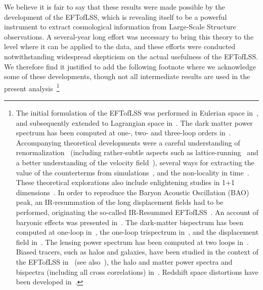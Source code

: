 \documentclass[12pt,a4paper]{article}
\renewcommand{\(}{\left(}
\renewcommand{\)}{\right)}
\begin{document}
We believe it is fair to say that these results were made possible by the development of the EFTofLSS, which is revealing itself to be a powerful instrument to extract cosmological information from Large-Scale Structure observations. 
A several-year long effort was necessary to bring this theory to the level where it can be applied to the data, and these efforts were conducted notwithstanding widespread skepticism on the actual usefulness of the EFTofLSS.  We therefore find it justified to add the following footnote where we acknowledge some of these developments, though not all intermediate results are used in the present analysis~\footnote{The initial formulation of the EFTofLSS was performed in Eulerian space in~\cite{Baumann:2010tm,Carrasco:2012cv}, and subsequently extended to Lagrangian space in~\cite{Porto:2013qua}. 
The dark matter power spectrum has been computed at one-, two- and three-loop orders in~\cite{Carrasco:2012cv, Carrasco:2013sva, Carrasco:2013mua, Carroll:2013oxa, Senatore:2014via, Baldauf:2015zga, Foreman:2015lca, Baldauf:2015aha, Cataneo:2016suz, Lewandowski:2017kes,Konstandin:2019bay}.
Accompanying theoretical developments were a careful understanding of renormalization~\cite{Carrasco:2012cv,Pajer:2013jj,Abolhasani:2015mra} (including rather-subtle aspects such as lattice-running~\cite{Carrasco:2012cv} and a better understanding of the velocity field~\cite{Carrasco:2013sva,Mercolli:2013bsa}), several ways for extracting the value of the counterterms from simulations~\cite{Carrasco:2012cv,McQuinn:2015tva}, and the non-locality in time~\cite{Carrasco:2013sva, Carroll:2013oxa,Senatore:2014eva}.
These theoretical explorations also include enlightening studies in 1+1 dimensions~\cite{McQuinn:2015tva,Pajer:2017ulp}.
In order to reproduce the Baryon Acoustic Oscillation (BAO) peak, an IR-resummation of the long displacement fields had to be performed, originating the so-called IR-Resummed EFTofLSS~\cite{Senatore:2014vja,Baldauf:2015xfa,Senatore:2017pbn,Lewandowski:2018ywf,Blas:2016sfa}.
An account of baryonic effects was presented in~\cite{Lewandowski:2014rca,Braganca:2020nhv}. The dark-matter bispectrum has been computed at one-loop in~\cite{Angulo:2014tfa, Baldauf:2014qfa}, the one-loop trispectrum in~\cite{Bertolini:2016bmt}, and the displacement field in~\cite{Baldauf:2015tla}.
The lensing power spectrum has been computed at two loops in~\cite{Foreman:2015uva}.
Biased tracers, such as halos and galaxies, have been studied in the context of the EFTofLSS in~\cite{ Senatore:2014eva, Mirbabayi:2014zca, Angulo:2015eqa, Fujita:2016dne, Perko:2016puo, Nadler:2017qto} (see also~\cite{McDonald:2009dh}), the halo and matter power spectra and bispectra (including all cross correlations) in~\cite{Senatore:2014eva, Angulo:2015eqa}. Redshift space distortions have been developed in~\cite{Senatore:2014vja, Lewandowski:2015ziq,Perko:2016puo}.
}
\end{document}
